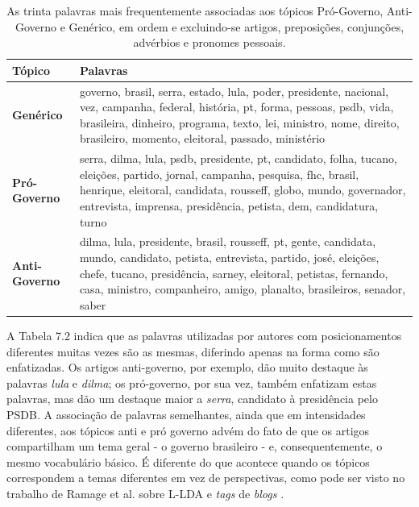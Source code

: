 \begin{table}[h]
\centering
\begin{tabular}{| l | p{10cm} | }
\hline
\textbf{Tópico} & \textbf{Palavras} \\ \hline
\textbf{Genérico} &  governo, brasil, serra, estado, lula, poder, presidente, nacional, vez, campanha, federal, história, pt, forma, pessoas, psdb, vida, brasileira, dinheiro, programa, texto, lei, ministro, nome, direito, brasileiro, momento, eleitoral, passado, ministério \\ \hline
\textbf{Pró-Governo} & serra, dilma, lula, psdb, presidente, pt, candidato, folha, tucano, eleições, partido, jornal, campanha, pesquisa, fhc, brasil, henrique, eleitoral, candidata, rousseff, globo, mundo, governador, entrevista, imprensa, presidência, petista, dem, candidatura, turno\\ \hline
\textbf{Anti-Governo} & dilma, lula, presidente, brasil, rousseff, pt, gente, candidata, mundo, candidato, petista, entrevista, partido, josé, eleições, chefe, tucano, presidência, sarney, eleitoral, petistas, fernando, casa, ministro, companheiro, amigo, planalto, brasileiros, senador, saber \\ \hline
\end{tabular}
\label{tab:palavras}
\caption{As trinta palavras mais frequentemente associadas aos tópicos Pró-Governo, Anti-Governo e Genérico, em ordem e excluindo-se artigos, preposições, conjunções, advérbios e pronomes pessoais.}
\end{table}


A Tabela 7.2 indica que as palavras utilizadas por autores com posicionamentos diferentes muitas vezes são as mesmas, diferindo apenas na forma como são enfatizadas. Os artigos anti-governo, por exemplo, dão muito destaque às palavras \emph{lula} e \emph{dilma}; os pró-governo, por sua vez, também enfatizam estas palavras, mas dão um destaque maior a \emph{serra}, candidato à presidência pelo PSDB. A associação de palavras semelhantes, ainda que em intensidades diferentes, aos tópicos anti e pró governo advém do fato de que os artigos compartilham um tema geral - o governo brasileiro - e, consequentemente, o mesmo vocabulário básico. É diferente do que acontece quando os tópicos correspondem a temas diferentes em vez de perspectivas, como pode ser visto no trabalho de Ramage et al. sobre L-LDA e \emph{tags} de \emph{blogs} \cite{llda}.

